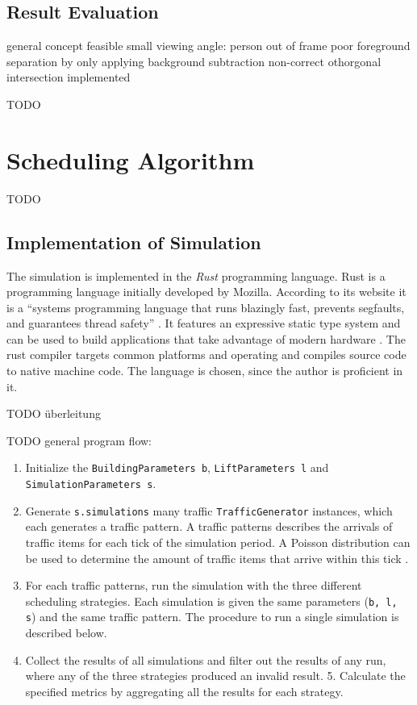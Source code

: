 \subsection{Result Evaluation}
general concept feasible
small viewing angle: person out of frame
poor foreground separation by only applying background subtraction
non-correct othorgonal intersection implemented

TODO

\section{Scheduling Algorithm}
TODO
\subsection{Implementation of Simulation}

The simulation is implemented in the \emph{Rust} programming language.
Rust is a programming language initially developed by Mozilla.
According to its website it is a \enquote{systems programming language that runs blazingly fast, prevents segfaults, and guarantees thread safety} \autocite{rust2018rust}.
It features an expressive static type system and can be used to build applications that take advantage of modern hardware
\autocite[][]{matsakis2014rust}.
The rust compiler targets common platforms and operating and compiles source code to native machine code.
The language is chosen, since the author is proficient in it.

TODO überleitung

TODO
general program flow:


\begin{enumerate}
    \item Initialize the \texttt{BuildingParameters b}, \texttt{LiftParameters l} and\\ \texttt{SimulationParameters s}.
    \item Generate \texttt{s.simulations} many traffic \texttt{TrafficGenerator} instances, which each generates a traffic pattern. A traffic patterns describes the arrivals of traffic items for each tick of the simulation period. A Poisson distribution can be used to determine the amount of traffic items that arrive within this tick \autocite{beers2015arrivals}.
    \item For each traffic patterns, run the simulation with the three different scheduling strategies. Each simulation is given the same parameters (\texttt{b, l, s}) and the same traffic pattern. The procedure to run a single simulation is described below.
    \item Collect the results of all simulations and filter out the results of any run, where any of the three strategies produced an invalid result.
    5. Calculate the specified metrics by aggregating all the results for each strategy.
\end{enumerate}

